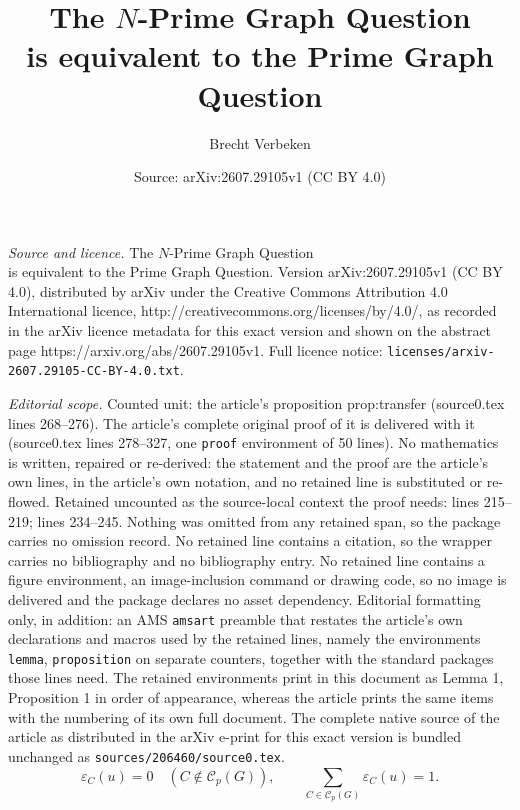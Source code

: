 \documentclass[10pt,a4paper]{amsart}
\title{The $N$-Prime Graph Question\\ is equivalent to the Prime Graph Question}
\author{Brecht Verbeken}
\date{Source: arXiv:2607.29105v1 (CC BY 4.0)}
\newcommand{\eps}{\varepsilon}
\begin{document}
\maketitle

\noindent\emph{Source and licence.} The $N$-Prime Graph Question\\ is equivalent to the Prime Graph Question. Version arXiv:2607.29105v1 (CC BY 4.0), distributed by arXiv under the Creative Commons Attribution 4.0 International licence, http://creativecommons.org/licenses/by/4.0/, as recorded in the arXiv licence metadata for this exact version and shown on the abstract page https://arxiv.org/abs/2607.29105v1. Full licence notice: \texttt{licenses/arxiv-2607.29105-CC-BY-4.0.txt}.\par\smallskip

\noindent\textit{Editorial scope.} Counted unit: the article's proposition prop:transfer (source0.tex lines 268--276). The article's complete original proof of it is delivered with it (source0.tex lines 278--327, one \texttt{proof} environment of 50 lines). No mathematics is written, repaired or re-derived: the statement and the proof are the article's own lines, in the article's own notation, and no retained line is substituted or re-flowed.  Retained uncounted as the source-local context the proof needs: lines 215--219; lines 234--245.  Nothing was omitted from any retained span, so the package carries no omission record.  No retained line contains a citation, so the wrapper carries no bibliography and no bibliography entry.  No retained line contains a figure environment, an image-inclusion command or drawing code, so no image is delivered and the package declares no asset dependency.  Editorial formatting only, in addition: an AMS \texttt{amsart} preamble that restates the article's own declarations and macros used by the retained lines, namely the environments \texttt{lemma}, \texttt{proposition} on separate counters, together with the standard packages those lines need.  The retained environments print in this document as Lemma 1, Proposition 1 in order of appearance, whereas the article prints the same items with the numbering of its own full document.  The complete native source of the article as distributed in the arXiv e-print for this exact version is bundled unchanged as \texttt{sources/206460/source0.tex}.
\begin{equation}\label{eq:support}
 \eps_C(u)=0\quad(C\notin\mathcal C_p(G)),
 \qquad
 \sum_{C\in\mathcal C_p(G)}\eps_C(u)=1.
\end{equation}
\end{document}

